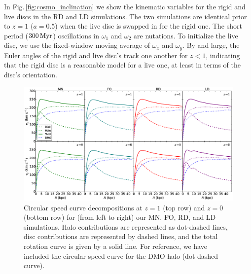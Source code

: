 In Fig.\,\ref{fig:cosmo_inclination} we show the kinematic variables
for the rigid and live discs in the RD and LD simulations.  The two
simulations are identical prior to $z=1$ ($a=0.5$) when the live disc
is swapped in for the rigid one.  The short period ($300\,{\rm Myr}$)
oscillations in $\omega_1$ and $\omega_2$ are nutations.  To
initialize the live disc, we use the fixed-window moving average of $\omega_x$ and
$\omega_y$.  By and large, the Euler angles of the rigid and live
disc's track one another for $z<1$, indicating that the rigid disc
is a reasonable model for a live one, at least in terms of the disc's
orientation.

\begin{figure}
\centering 
\includegraphics[width=1.\textwidth]{../figures/all_rotation_curves_five_sims}
\caption{Circular speed curve decompositions at $z=1$ (top row) and
  $z=0$ (bottom row) for (from left to right) our MN, FO, RD, and LD
  simulations.  Halo contributions are represented as dot-dashed
  lines, disc contributions are represented by dashed lines, and the
  total rotation curve is given by a solid line.  For reference, we have
  included the circular speed curve for the DMO halo (dot-dashed curve).}
\label{fig:rotation_curves}
\end{figure} 

